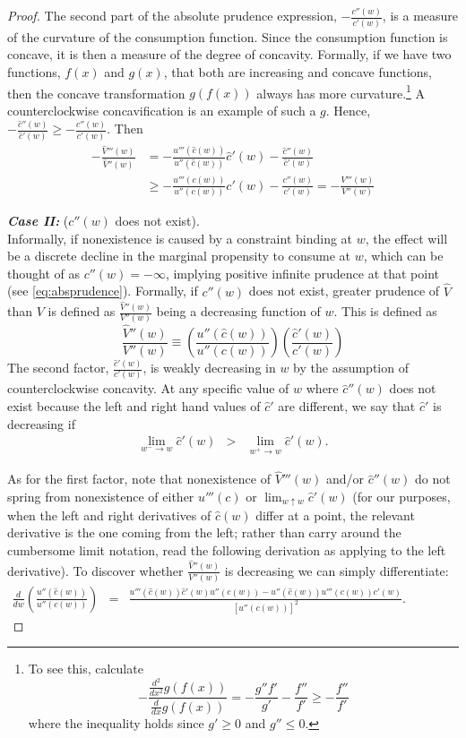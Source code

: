 \documentclass[titlepage]{\econtex}
\begin{document}
\begin{proof}
	The second part of the absolute prudence expression, $-\frac{c''(w)}{c'(w)}$, is a measure of the curvature of the consumption function. Since the consumption function is concave, it is then a measure of the degree of concavity. Formally, if we have two functions, $f(x)$ and $g(x)$, that both are increasing and concave functions, then the concave transformation $g(f(x))$ always has more curvature.\footnote{To see this, calculate \[-\frac{\frac{d^2}{dx^2} g(f(x))}{\frac{d}{dx}g(f(x))} = - \frac{g''f'}{g'} - \frac{f''}{f'} \geq - \frac{f''}{f'}\] where the inequality holds since $g' \geq 0$ and $g'' \leq 0$.} A counterclockwise concavification is an example of such a $g$. Hence, $-\frac{\hat{c}''(w)}{\hat{c}'(w)} \geq -\frac{c''(w)}{c'(w)}$. Then
	\begin{align*}
	-\frac{\hat{V}'''(w)}{\hat{V}''(w)} &= -\frac{u'''(\hat{c}(w))}{u''(\hat{c}(w))}\hat{c}'(w) - \frac{\hat{c}''(w)}{\hat{c}'(w)} \\ 
	&\geq -\frac{u'''(c(w))}{u''(c(w))}c'(w) - \frac{c''(w)}{c'(w)} = -\frac{V'''(w)}{V''(w)}
	\end{align*}
	
	\bigskip
	\noindent \textbf{\textit{Case II:}} ($c''(w)$ does not exist).\\
	Informally, if nonexistence is caused by a constraint binding at $w$, the effect will be a discrete decline in the marginal propensity to consume at $w$, which can be thought of as $c''(w) = -\infty$, implying positive infinite prudence at that point (see \eqref{eq:absprudence}). Formally, if $c''(w)$ does not exist, greater prudence of $\hat{V}$ than $V$ is defined as $\frac{\hat{V}''(w)}{V''(w)}$ being a decreasing function of $w$. This is defined as
	\[\frac{\hat{V}''(w)}{V''(w)} \equiv 
	\left(\frac{u''(\hat c(w))}{u''(c(w))} \right)
	\left(\frac{\hat{c}'(w)}{c'(w)}\right)\]
	The second factor, $\frac{\hat{c}'(w)}{c'(w)}$, is weakly decreasing in $w$ by the assumption of counterclockwise concavity. At any specific value of $w$ where
	$\hat{c}''(w)$ does not exist because the left and right hand
	values of $\hat{c}'$ are different, we say that $\hat{c}'$
	is decreasing if
	\begin{eqnarray}
	\lim_{w^{-} \rightarrow w} \hat{c}'(w) & > & \lim_{w^{+} \rightarrow w} \hat{c}'(w).
	\end{eqnarray}
	
	As for the first factor, note that nonexistence of
	$\hat{V}'''(w)$ and/or $\hat{c}''(w)$ do not
	spring from nonexistence of either $u'''(c)$ or $\lim_{w \uparrow
		w} \hat{c}'(w)$ (for our purposes, when the
	left and right derivatives of $\hat{c}(w)$ differ at a point, the
	relevant derivative is the one coming from the left; rather than carry
	around the cumbersome limit notation, read the following derivation as
	applying to the left derivative).  To discover whether $\frac{\hat
		{V}''(w)}{V''(w)}$ is decreasing we can simply
	differentiate:
	\begin{align*}
	\frac{d}{d w}\left( \frac{u''(\hat{c}(w))}{ u''(c(w))}\right) &=& \frac{u'''(\hat{c}(w))\hat{c}'(w)u''(c(w))-u''(\hat{c}(w))u'''(c(w))c'(w)}{[u''(c(w))]^{2}}. \qquad \qquad
	\end{align*}
	

\end{proof}
\end{document}
